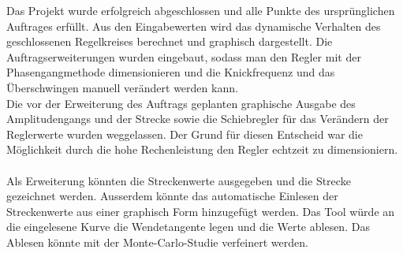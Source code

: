 Das Projekt wurde erfolgreich abgeschlossen und alle Punkte des ursprünglichen Auftrages erfüllt. Aus den Eingabewerten wird das dynamische Verhalten des geschlossenen Regelkreises berechnet und graphisch dargestellt. Die Auftragserweiterungen wurden eingebaut, sodass man den Regler mit der Phasengangmethode dimensionieren und die Knickfrequenz und das Überschwingen manuell verändert werden kann. \\Die vor der Erweiterung des Auftrags geplanten graphische Ausgabe des Amplitudengangs und der Strecke sowie die Schiebregler für das Verändern der Reglerwerte wurden weggelassen. Der Grund für diesen Entscheid war die Möglichkeit durch die hohe Rechenleistung den Regler echtzeit zu dimensioniern.\\
\\
Als Erweiterung könnten die Streckenwerte ausgegeben und die Strecke gezeichnet werden. Ausserdem könnte das automatische Einlesen der Streckenwerte aus einer graphisch Form hinzugefügt werden. Das Tool würde an die eingelesene Kurve die Wendetangente legen und die Werte ablesen. Das Ablesen könnte mit der Monte-Carlo-Studie verfeinert werden.